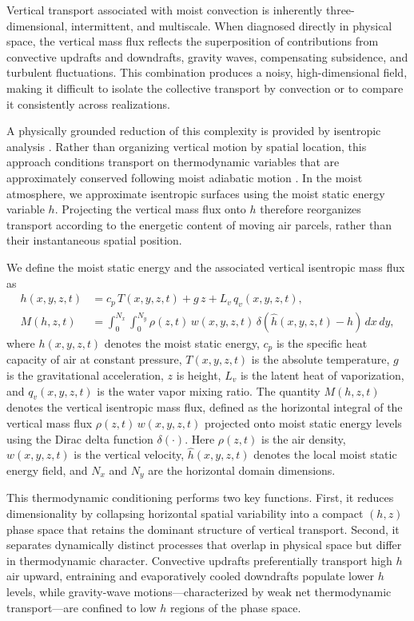 \documentclass[11pt]{article}
\begin{document}
Vertical transport associated with moist convection is inherently three-dimensional, intermittent, and multiscale. When diagnosed directly in physical space, the vertical mass flux reflects the superposition of contributions from convective updrafts and downdrafts, gravity waves, compensating subsidence, and turbulent fluctuations. This combination produces a noisy, high-dimensional field, making it difficult to isolate the collective transport by convection or to compare it consistently across realizations.

A physically grounded reduction of this complexity is provided by isentropic analysis \cite{pauluis2013isentropic}. Rather than organizing vertical motion by spatial location, this approach conditions transport on thermodynamic variables that are approximately conserved following moist adiabatic motion \cite{chen2022crucial}. In the moist atmosphere, we approximate isentropic surfaces using the moist static energy variable $h$. Projecting the vertical mass flux onto $h$ therefore reorganizes transport according to the energetic content of moving air parcels, rather than their instantaneous spatial position.

We define the moist static energy and the associated vertical isentropic mass flux as
\begin{align}
    h(x,y,z,t) & = c_p\, T(x,y,z,t)+ g\, z + L_v\, q_v(x,y,z,t),\\ 
    M(h,z,t) &= \int_{0}^{N_x}\int_{0}^{N_y} \rho(z,t)\,w(x,y,z,t)\,
    \delta\!\left(\hat{h}(x,y,z,t)-h\right)\,dx\,dy,
\end{align}
where $h(x,y,z,t)$ denotes the moist static energy, $c_p$ is the specific heat capacity of air at constant pressure, $T(x,y,z,t)$ is the absolute temperature, $g$ is the gravitational acceleration, $z$ is height, $L_v$ is the latent heat of vaporization, and $q_v(x,y,z,t)$ is the water vapor mixing ratio. The quantity $M(h,z,t)$ denotes the vertical isentropic mass flux, defined as the horizontal integral of the vertical mass flux $\rho(z,t)\,w(x,y,z,t)$ projected onto moist static energy levels using the Dirac delta function $\delta(\cdot)$. Here $\rho(z,t)$ is the air density, $w(x,y,z,t)$ is the vertical velocity, $\hat{h}(x,y,z,t)$ denotes the local moist static energy field, and $N_x$ and $N_y$ are the horizontal domain dimensions.

This thermodynamic conditioning performs two key functions. First, it reduces dimensionality by collapsing horizontal spatial variability into a compact $(h,z)$ phase space that retains the dominant structure of vertical transport. Second, it separates dynamically distinct processes that overlap in physical space but differ in thermodynamic character. Convective updrafts preferentially transport high $h$ air upward, entraining and evaporatively cooled downdrafts populate lower $h$ levels, while gravity-wave motions—characterized by weak net thermodynamic transport—are confined to low $h$ regions of the phase space\citep{chen2018atmospheric, chen2020significant}.
\end{document}
